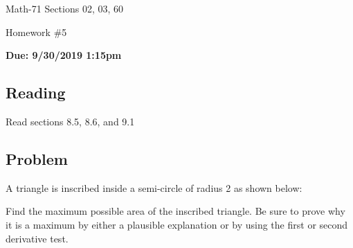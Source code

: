 \documentclass[letterpaper,12pt,fleqn]{article}
\begin{document}
\begin{center}
  \large
  Math-71 Sections 02, 03, 60

  \Large
  Homework \#5

  \large
  \textbf{Due: 9/30/2019 1:15pm}
\end{center}

\subsection*{Reading}

Read sections 8.5, 8.6, and 9.1

\subsection*{Problem}

A triangle is inscribed inside a semi-circle of radius 2 as shown below:

\bigskip

\begin{center}
\end{center}

\bigskip

Find the maximum possible area of the inscribed triangle.  Be sure to prove why it is a maximum by either a plausible
explanation or by using the first or second derivative test.
\end{document}
